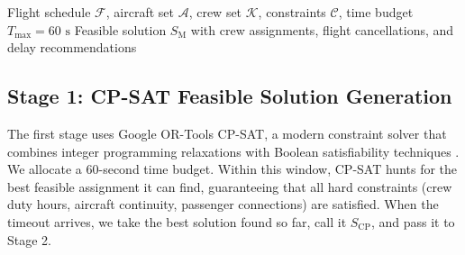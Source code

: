 \documentclass[12pt,number]{elsarticle}
\begin{document}
\begin{algorithm}[!ht]
\caption{Hybrid CP-SAT + QIGA Framework}
\label{alg:hybrid}
\begin{algorithmic}[1]
\Require Flight schedule $\mathcal{F}$, aircraft set $\mathcal{A}$, crew set $\mathcal{K}$, constraints $\mathcal{C}$, time budget $T_{\max}=60\text{ s}$
\Ensure Feasible solution $S_{\mathrm{M}}$ with crew assignments, flight cancellations, and delay recommendations

\Else
\EndIf


  \EndFor
\EndFor

\end{algorithmic}
\end{algorithm}

\subsection{Stage 1: CP-SAT Feasible Solution Generation}

The first stage uses Google OR-Tools CP-SAT, a modern constraint solver that combines integer programming relaxations with Boolean satisfiability techniques \cite{perron2023}. We allocate a 60-second time budget. Within this window, CP-SAT hunts for the best feasible assignment it can find, guaranteeing that all hard constraints (crew duty hours, aircraft continuity, passenger connections) are satisfied. When the timeout arrives, we take the best solution found so far, call it $S_{\mathrm{CP}}$, and pass it to Stage 2.
\end{document}

